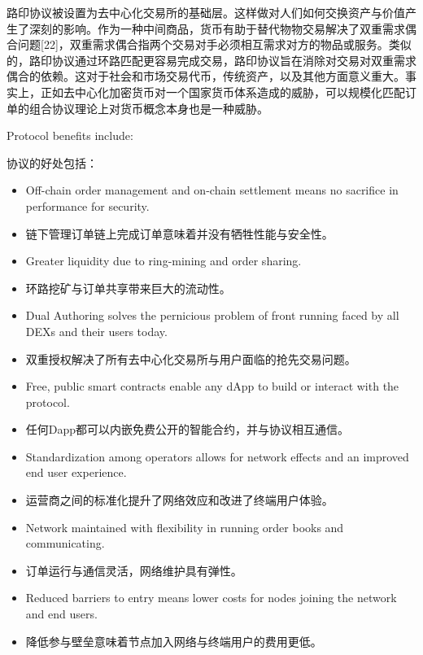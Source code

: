\documentclass[UTF8,nofonts]{ctexart}
\begin{document}
\begin{multicols}{2}
路印协议被设置为去中心化交易所的基础层。这样做对人们如何交换资产与价值产生了深刻的影响。作为一种中间商品，货币有助于替代物物交易解决了双重需求偶合问题[22]，双重需求偶合指两个交易对手必须相互需求对方的物品或服务。类似的，路印协议通过环路匹配更容易完成交易，路印协议旨在消除对交易对双重需求偶合的依赖。这对于社会和市场交易代币，传统资产，以及其他方面意义重大。事实上，正如去中心化加密货币对一个国家货币体系造成的威胁，可以规模化匹配订单的组合协议理论上对货币概念本身也是一种威胁。

Protocol benefits include:

协议的好处包括：

\begin{itemize}
	\item Off-chain order management and on-chain settlement means no sacrifice in performance for security.
	\item 链下管理订单链上完成订单意味着并没有牺牲性能与安全性。

	\item Greater liquidity due to ring-mining and order sharing.
	\item 环路挖矿与订单共享带来巨大的流动性。

	\item Dual Authoring solves the pernicious problem of front running faced by all DEXs and their users today.
	\item 双重授权解决了所有去中心化交易所与用户面临的抢先交易问题。

	\item Free, public smart contracts enable any dApp to build or interact with the protocol.
	\item 任何Dapp都可以内嵌免费公开的智能合约，并与协议相互通信。

	\item Standardization among operators allows for network effects and an improved end user experience.
	\item 运营商之间的标准化提升了网络效应和改进了终端用户体验。

	\item Network maintained with flexibility in running order books and communicating.
	\item 订单运行与通信灵活，网络维护具有弹性。

	\item Reduced barriers to entry means lower costs for nodes joining the network and end users.
	\item 降低参与壁垒意味着节点加入网络与终端用户的费用更低。


\end{itemize}
\end{multicols}
\end{document}
